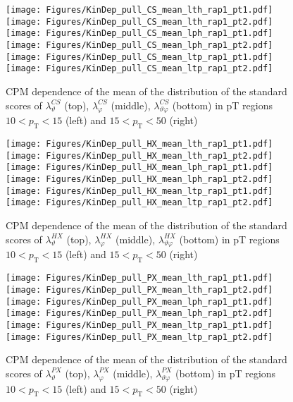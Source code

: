 \documentclass[12pt]{article}
\newcommand{\pT}{p_\mathrm{T}}
\newcommand{\lamthCS}{\lambda^{\scriptscriptstyle CS}_\vartheta}
\newcommand{\lamphCS}{\lambda^{\scriptscriptstyle CS}_\varphi}
\newcommand{\lamthphCS}{\lambda^{\scriptscriptstyle CS}_{\vartheta \varphi}}
\newcommand{\lamthHX}{\lambda^{\scriptscriptstyle HX}_\vartheta}
\newcommand{\lamphHX}{\lambda^{\scriptscriptstyle HX}_\varphi}
\newcommand{\lamthphHX}{\lambda^{\scriptscriptstyle HX}_{\vartheta \varphi}}
\newcommand{\lamthPX}{\lambda^{\scriptscriptstyle PX}_\vartheta}
\newcommand{\lamphPX}{\lambda^{\scriptscriptstyle PX}_\varphi}
\newcommand{\lamthphPX}{\lambda^{\scriptscriptstyle PX}_{\vartheta \varphi}}
\begin{document}


\begin{figure}[htbp]
\centering
\texttt{[image: Figures/KinDep\_pull\_CS\_mean\_lth\_rap1\_pt1.pdf]}
\texttt{[image: Figures/KinDep\_pull\_CS\_mean\_lth\_rap1\_pt2.pdf]}
\texttt{[image: Figures/KinDep\_pull\_CS\_mean\_lph\_rap1\_pt1.pdf]}
\texttt{[image: Figures/KinDep\_pull\_CS\_mean\_lph\_rap1\_pt2.pdf]}
\texttt{[image: Figures/KinDep\_pull\_CS\_mean\_ltp\_rap1\_pt1.pdf]}
\texttt{[image: Figures/KinDep\_pull\_CS\_mean\_ltp\_rap1\_pt2.pdf]}
\caption{CPM dependence of the mean of the distribution of the standard scores
of $\lamthCS$ (top), $\lamphCS$ (middle), $\lamthphCS$ (bottom) in pT regions $10<\pT<15$ (left) and $15<\pT<50$ (right)}
\end{figure}
\clearpage

\begin{figure}[htbp]
\centering
\texttt{[image: Figures/KinDep\_pull\_HX\_mean\_lth\_rap1\_pt1.pdf]}
\texttt{[image: Figures/KinDep\_pull\_HX\_mean\_lth\_rap1\_pt2.pdf]}
\texttt{[image: Figures/KinDep\_pull\_HX\_mean\_lph\_rap1\_pt1.pdf]}
\texttt{[image: Figures/KinDep\_pull\_HX\_mean\_lph\_rap1\_pt2.pdf]}
\texttt{[image: Figures/KinDep\_pull\_HX\_mean\_ltp\_rap1\_pt1.pdf]}
\texttt{[image: Figures/KinDep\_pull\_HX\_mean\_ltp\_rap1\_pt2.pdf]}
\caption{CPM dependence of the mean of the distribution of the standard scores
of $\lamthHX$ (top), $\lamphHX$ (middle), $\lamthphHX$ (bottom) in pT regions $10<\pT<15$ (left) and $15<\pT<50$ (right)}
\end{figure}
\clearpage

\begin{figure}[htbp]
\centering
\texttt{[image: Figures/KinDep\_pull\_PX\_mean\_lth\_rap1\_pt1.pdf]}
\texttt{[image: Figures/KinDep\_pull\_PX\_mean\_lth\_rap1\_pt2.pdf]}
\texttt{[image: Figures/KinDep\_pull\_PX\_mean\_lph\_rap1\_pt1.pdf]}
\texttt{[image: Figures/KinDep\_pull\_PX\_mean\_lph\_rap1\_pt2.pdf]}
\texttt{[image: Figures/KinDep\_pull\_PX\_mean\_ltp\_rap1\_pt1.pdf]}
\texttt{[image: Figures/KinDep\_pull\_PX\_mean\_ltp\_rap1\_pt2.pdf]}
\caption{CPM dependence of the mean of the distribution of the standard scores
of $\lamthPX$ (top), $\lamphPX$ (middle), $\lamthphPX$ (bottom) in pT regions $10<\pT<15$ (left) and $15<\pT<50$ (right)}
\end{figure}
\clearpage
\end{document}
